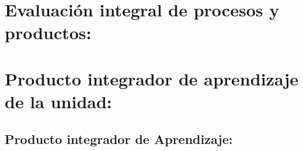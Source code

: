 


\newpage
  
\section{Evaluaci\'{o}n integral de procesos y productos:}



\newpage

\section{Producto integrador de aprendizaje de la unidad:}
\subsection{Producto integrador de Aprendizaje:} 


